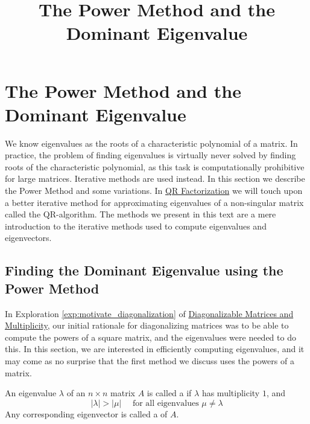 \documentclass{ximera}
\title{The Power Method and the Dominant Eigenvalue} \license{CC BY-NC-SA 4.0}
\begin{document}
\begin{abstract}
\end{abstract}
\maketitle

\section*{The Power Method and the Dominant Eigenvalue}
We know eigenvalues as the roots of a characteristic polynomial of a matrix.  In practice, the problem of finding eigenvalues is virtually never solved by finding roots of the characteristic polynomial, as this task is computationally prohibitive for large matrices.  Iterative methods are used instead.  In this section we describe the Power Method and some variations.  In \href{https://ximera.osu.edu/oerlinalg/LinearAlgebra/RTH-0040/main}{QR Factorization} we will touch upon a better iterative method for approximating eigenvalues of a non-singular matrix called the QR-algorithm.  The methods we present in this text are a mere introduction to the iterative methods used to compute eigenvalues and eigenvectors.
  
\subsection*{Finding the Dominant Eigenvalue using the Power Method}

In Exploration \ref{exp:motivate_diagonalization} of \href{https://ximera.osu.edu/oerlinalg/LinearAlgebra/EIG-0050/main}{Diagonalizable Matrices and Multiplicity},
 our initial rationale for diagonalizing matrices was to be able to
compute the powers of a square matrix, and the eigenvalues were needed
to do this. In this section, we are interested in efficiently computing
eigenvalues, and it may come as no surprise that the first method we
discuss uses the powers of a matrix.

\begin{definition}\label{def:dominant ew,ev}
An eigenvalue $\lambda$ of an $n \times n$ matrix $A$ is called a  if $\lambda$ has multiplicity $1$, and
\begin{equation*}
|\lambda| > |\mu| \quad \mbox{ for all eigenvalues } \mu \neq \lambda
\end{equation*}
Any corresponding eigenvector is called a  of $A$.
\end{definition}
\end{document}
